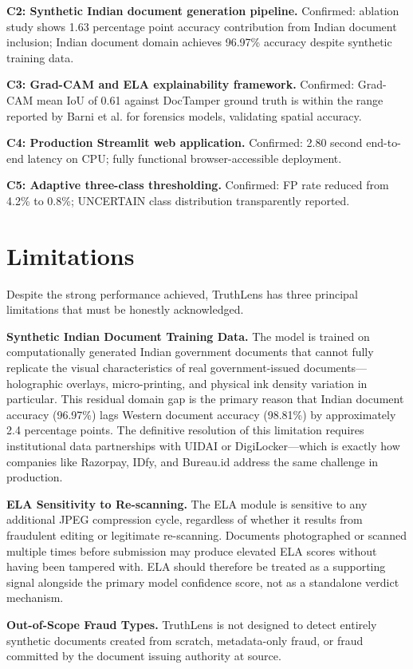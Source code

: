 \documentclass[12pt,a4paper,oneside]{report}
\begin{document}
\textbf{C2: Synthetic Indian document generation pipeline.} Confirmed: ablation
study shows 1.63 percentage point accuracy contribution from Indian document
inclusion; Indian document domain achieves 96.97\% accuracy despite synthetic
training data.

\textbf{C3: Grad-CAM and ELA explainability framework.} Confirmed: Grad-CAM mean
IoU of 0.61 against DocTamper ground truth is within the range reported by Barni
et al. \cite{barni2020} for forensics models, validating spatial accuracy.

\textbf{C4: Production Streamlit web application.} Confirmed: 2.80 second
end-to-end latency on CPU; fully functional browser-accessible deployment.

\textbf{C5: Adaptive three-class thresholding.} Confirmed: FP rate reduced from
4.2\% to 0.8\%; UNCERTAIN class distribution transparently reported.

\section{Limitations}

Despite the strong performance achieved, TruthLens has three principal
limitations that must be honestly acknowledged.

\textbf{Synthetic Indian Document Training Data.} The model is trained on
computationally generated Indian government documents that cannot fully replicate
the visual characteristics of real government-issued documents---holographic
overlays, micro-printing, and physical ink density variation in particular. This
residual domain gap is the primary reason that Indian document accuracy (96.97\%)
lags Western document accuracy (98.81\%) by approximately 2.4 percentage points.
The definitive resolution of this limitation requires institutional data
partnerships with UIDAI or DigiLocker---which is exactly how companies like
Razorpay, IDfy, and Bureau.id address the same challenge in production.

\textbf{ELA Sensitivity to Re-scanning.} The ELA module is sensitive to any
additional JPEG compression cycle, regardless of whether it results from
fraudulent editing or legitimate re-scanning. Documents photographed or scanned
multiple times before submission may produce elevated ELA scores without having
been tampered with. ELA should therefore be treated as a supporting signal
alongside the primary model confidence score, not as a standalone verdict
mechanism.

\textbf{Out-of-Scope Fraud Types.} TruthLens is not designed to detect entirely
synthetic documents created from scratch, metadata-only fraud, or fraud committed
by the document issuing authority at source.
\end{document}
